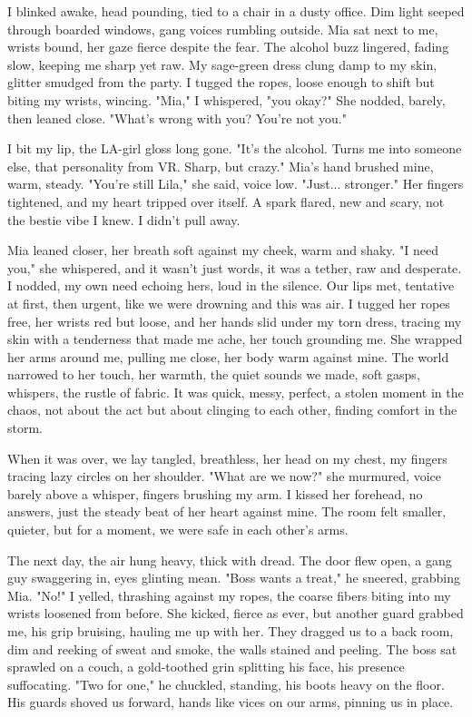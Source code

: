 \documentclass{article}
\begin{document}
I blinked awake, head pounding, tied to a chair in a dusty office. Dim light seeped through boarded windows, gang voices rumbling outside. Mia sat next to me, wrists bound, her gaze fierce despite the fear. The alcohol buzz lingered, fading slow, keeping me sharp yet raw. My sage-green dress clung damp to my skin, glitter smudged from the party. I tugged the ropes, loose enough to shift but biting my wrists, wincing. "Mia," I whispered, "you okay?" She nodded, barely, then leaned close. "What's wrong with you? You're not you."

I bit my lip, the LA-girl gloss long gone. "It's the alcohol. Turns me into someone else, that personality from VR. Sharp, but crazy." Mia's hand brushed mine, warm, steady. "You're still Lila," she said, voice low. "Just... stronger." Her fingers tightened, and my heart tripped over itself. A spark flared, new and scary, not the bestie vibe I knew. I didn't pull away.

Mia leaned closer, her breath soft against my cheek, warm and shaky. "I need you," she whispered, and it wasn't just words, it was a tether, raw and desperate. I nodded, my own need echoing hers, loud in the silence. Our lips met, tentative at first, then urgent, like we were drowning and this was air. I tugged her ropes free, her wrists red but loose, and her hands slid under my torn dress, tracing my skin with a tenderness that made me ache, her touch grounding me. She wrapped her arms around me, pulling me close, her body warm against mine. The world narrowed to her touch, her warmth, the quiet sounds we made, soft gasps, whispers, the rustle of fabric. It was quick, messy, perfect, a stolen moment in the chaos, not about the act but about clinging to each other, finding comfort in the storm.

When it was over, we lay tangled, breathless, her head on my chest, my fingers tracing lazy circles on her shoulder. "What are we now?" she murmured, voice barely above a whisper, fingers brushing my arm. I kissed her forehead, no answers, just the steady beat of her heart against mine. The room felt smaller, quieter, but for a moment, we were safe in each other's arms.

The next day, the air hung heavy, thick with dread. The door flew open, a gang guy swaggering in, eyes glinting mean. "Boss wants a treat," he sneered, grabbing Mia. "No!" I yelled, thrashing against my ropes, the coarse fibers biting into my wrists loosened from before. She kicked, fierce as ever, but another guard grabbed me, his grip bruising, hauling me up with her. They dragged us to a back room, dim and reeking of sweat and smoke, the walls stained and peeling. The boss sat sprawled on a couch, a gold-toothed grin splitting his face, his presence suffocating. "Two for one," he chuckled, standing, his boots heavy on the floor. His guards shoved us forward, hands like vices on our arms, pinning us in place.
\end{document}
